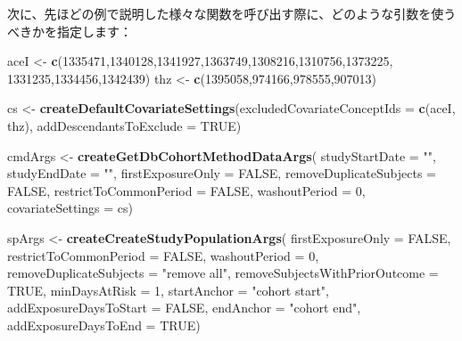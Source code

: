 \documentclass[
  11pt]{book}
\newenvironment{Shaded}{\begin{snugshade}}{\end{snugshade}}
\newcommand{\AttributeTok}[1]{\textcolor[rgb]{0.13,0.29,0.53}{#1}}
\newcommand{\ConstantTok}[1]{\textcolor[rgb]{0.56,0.35,0.01}{#1}}
\newcommand{\DecValTok}[1]{\textcolor[rgb]{0.00,0.00,0.81}{#1}}
\newcommand{\FunctionTok}[1]{\textcolor[rgb]{0.13,0.29,0.53}{\textbf{#1}}}
\newcommand{\NormalTok}[1]{#1}
\newcommand{\OtherTok}[1]{\textcolor[rgb]{0.56,0.35,0.01}{#1}}
\newcommand{\StringTok}[1]{\textcolor[rgb]{0.31,0.60,0.02}{#1}}
\theoremstyle{definition}
\theoremstyle{definition}
\theoremstyle{definition}
\theoremstyle{definition}
\theoremstyle{remark}
\begin{document}
次に、先ほどの例で説明した様々な関数を呼び出す際に、どのような引数を使うべきかを指定します：

\begin{Shaded}
\begin{Highlighting}[]
\NormalTok{aceI }\OtherTok{\textless{}{-}} \FunctionTok{c}\NormalTok{(}\DecValTok{1335471}\NormalTok{,}\DecValTok{1340128}\NormalTok{,}\DecValTok{1341927}\NormalTok{,}\DecValTok{1363749}\NormalTok{,}\DecValTok{1308216}\NormalTok{,}\DecValTok{1310756}\NormalTok{,}\DecValTok{1373225}\NormalTok{,}
          \DecValTok{1331235}\NormalTok{,}\DecValTok{1334456}\NormalTok{,}\DecValTok{1342439}\NormalTok{)}
\NormalTok{thz }\OtherTok{\textless{}{-}} \FunctionTok{c}\NormalTok{(}\DecValTok{1395058}\NormalTok{,}\DecValTok{974166}\NormalTok{,}\DecValTok{978555}\NormalTok{,}\DecValTok{907013}\NormalTok{)}

\NormalTok{cs }\OtherTok{\textless{}{-}} \FunctionTok{createDefaultCovariateSettings}\NormalTok{(}\AttributeTok{excludedCovariateConceptIds =} \FunctionTok{c}\NormalTok{(aceI,}
\NormalTok{                                                                     thz),}
                                     \AttributeTok{addDescendantsToExclude =} \ConstantTok{TRUE}\NormalTok{)}

\NormalTok{cmdArgs }\OtherTok{\textless{}{-}} \FunctionTok{createGetDbCohortMethodDataArgs}\NormalTok{(}
  \AttributeTok{studyStartDate =} \StringTok{""}\NormalTok{,}
  \AttributeTok{studyEndDate =} \StringTok{""}\NormalTok{,}
  \AttributeTok{firstExposureOnly =} \ConstantTok{FALSE}\NormalTok{,}
  \AttributeTok{removeDuplicateSubjects =} \ConstantTok{FALSE}\NormalTok{,}
  \AttributeTok{restrictToCommonPeriod =} \ConstantTok{FALSE}\NormalTok{,}
  \AttributeTok{washoutPeriod =} \DecValTok{0}\NormalTok{,}
  \AttributeTok{covariateSettings =}\NormalTok{ cs)}

\NormalTok{spArgs }\OtherTok{\textless{}{-}} \FunctionTok{createCreateStudyPopulationArgs}\NormalTok{(}
  \AttributeTok{firstExposureOnly =} \ConstantTok{FALSE}\NormalTok{,}
  \AttributeTok{restrictToCommonPeriod =} \ConstantTok{FALSE}\NormalTok{,}
  \AttributeTok{washoutPeriod =} \DecValTok{0}\NormalTok{,}
  \AttributeTok{removeDuplicateSubjects =} \StringTok{"remove all"}\NormalTok{,}
  \AttributeTok{removeSubjectsWithPriorOutcome =} \ConstantTok{TRUE}\NormalTok{,}
  \AttributeTok{minDaysAtRisk =} \DecValTok{1}\NormalTok{,}
  \AttributeTok{startAnchor =} \StringTok{"cohort start"}\NormalTok{,}
  \AttributeTok{addExposureDaysToStart =} \ConstantTok{FALSE}\NormalTok{,}
  \AttributeTok{endAnchor =} \StringTok{"cohort end"}\NormalTok{,}
  \AttributeTok{addExposureDaysToEnd =} \ConstantTok{TRUE}\NormalTok{)}


\end{Highlighting}
\end{Shaded}
\end{document}
